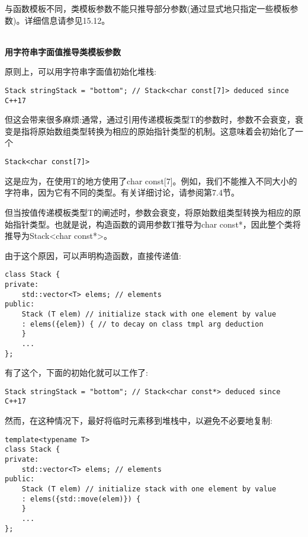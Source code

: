 与函数模板不同，类模板参数不能只推导部分参数(通过显式地只指定一些模板参数)。详细信息请参见15.12。

\hspace*{\fill} \\ %
\noindent
\textbf{用字符串字面值推导类模板参数}

原则上，可以用字符串字面值初始化堆栈:

\begin{lstlisting}[style=styleCXX]
Stack stringStack = "bottom"; // Stack<char const[7]> deduced since C++17
\end{lstlisting}

但这会带来很多麻烦:通常，通过引用传递模板类型T的参数时，参数不会衰变，衰变是指将原始数组类型转换为相应的原始指针类型的机制。这意味着会初始化了一个

\begin{lstlisting}[style=styleCXX]
Stack<char const[7]>
\end{lstlisting}

这是应为，在使用T的地方使用了char const[7]。例如，我们不能推入不同大小的字符串，因为它有不同的类型。有关详细讨论，请参阅第7.4节。

但当按值传递模板类型T的阐述时，参数会衰变，将原始数组类型转换为相应的原始指针类型。也就是说，构造函数的调用参数T推导为char const*，因此整个类将推导为Stack<char const*>。

由于这个原因，可以声明构造函数，直接传递值:

\begin{lstlisting}[style=styleCXX]
class Stack {
private:
	std::vector<T> elems; // elements
public:
	Stack (T elem) // initialize stack with one element by value
	: elems({elem}) { // to decay on class tmpl arg deduction
	}
	...
};
\end{lstlisting}

有了这个，下面的初始化就可以工作了:

\begin{lstlisting}[style=styleCXX]
Stack stringStack = "bottom"; // Stack<char const*> deduced since C++17
\end{lstlisting}

然而，在这种情况下，最好将临时元素移到堆栈中，以避免不必要地复制:

\begin{lstlisting}[style=styleCXX]
template<typename T>
class Stack {
private:
	std::vector<T> elems; // elements
public:
	Stack (T elem) // initialize stack with one element by value
	: elems({std::move(elem)}) {
	}
	...
};
\end{lstlisting}

